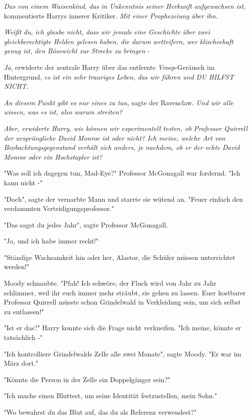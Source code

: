{\emph{Das von einem Waisenkind, das in Unkenntnis seiner Herkunft aufgewachsen ist,} kommentierte Harrys innerer Kritiker. \emph{Mit einer Prophezeiung über ihn.}

\emph{Weißt du, ich glaube nicht, dass wir jemals eine Geschichte über zwei gleichberechtigte Helden gelesen haben, die darum wetteifern, wer klischeehaft genug ist, den Bösewicht zur Strecke zu bringen} -

\emph{Ja}, erwiderte der zentrale Harry über das entfernte \emph{Vroop}-Geräusch im Hintergrund, \emph{es ist ein sehr trauriges Leben, das wir führen und DU HILFST NICHT.}

\emph{An diesem Punkt gibt es nur eines zu tun,} sagte der Ravenclaw. \emph{Und wir alle wissen, was es ist, also warum streiten?}

\emph{Aber, erwiderte Harry, wie können wir experimentell testen, ob Professor Quirrell der ursprüngliche David Monroe ist oder nicht? Ich meine, welche Art von Beobachtungsgegenstand verhält sich anders, je nachdem, ob er der echte David Monroe oder ein Hochstapler ist?}

"Was soll ich dagegen tun, Mad-Eye?" Professor McGonagall war fordernd. "Ich kann nicht -"

"Doch", sagte der vernarbte Mann und starrte sie wütend an. "Feuer einfach den verdammten Verteidigungsprofessor."

"Das sagst du jedes Jahr", sagte Professor McGonagall.

"Ja, und ich habe immer recht!"

"Ständige Wachsamkeit hin oder her, Alastor, die Schüler müssen unterrichtet werden!"

Moody schnaubte. "Pfah! Ich schwöre, der Fluch wird von Jahr zu Jahr schlimmer, weil ihr euch immer mehr sträubt, sie gehen zu lassen. Euer kostbarer Professor Quirrell müsste schon Grindelwald in Verkleidung sein, um sich selbst zu entlassen!"

"Ist er das?" Harry konnte sich die Frage nicht verkneifen. "Ich meine, könnte er tatsächlich -"

"Ich kontrolliere Grindelwalds Zelle alle zwei Monate", sagte Moody. "Er war im März dort."

"Könnte die Person in der Zelle ein Doppelgänger sein?"

"Ich mache einen Bluttest, um seine Identität festzustellen, mein Sohn."

"Wo bewahrst du das Blut auf, das du als Referenz verwendest?"

}
